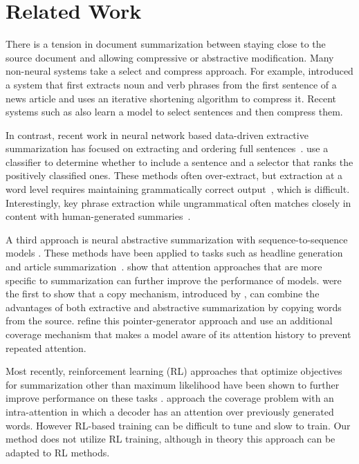 \documentclass[11pt,a4paper]{article}
\begin{document}
\section{Related Work}
 
There is a tension in document summarization between staying close
to the source document and allowing compressive or abstractive modification. Many non-neural systems take a select and compress approach. For example, \citet{dorr2003hedge} introduced a system that first extracts noun and verb phrases from the first sentence of a news article and uses an iterative shortening algorithm to compress it. Recent systems such as \citet{durrett2016learning} also learn a model to select sentences and then compress them. 

In contrast, recent work in neural network based data-driven extractive summarization has focused on  extracting and ordering full sentences~\citep{cheng2016neural,dlikman2016using}. \citet{nallapati2016classify} use a classifier to determine whether to include a sentence and a selector that ranks the positively classified ones. 
These methods often over-extract, but extraction at a word level requires maintaining grammatically correct output~\citep{cheng2016neural}, which is difficult. Interestingly, key phrase extraction while ungrammatical often matches closely in content with human-generated summaries~\citep{bui2016extractive}.
 
A third approach is neural abstractive summarization with
sequence-to-sequence models
\cite{sutskever2014sequence,bahdanau2014neural}. These methods have
been applied to tasks such as headline
generation~\citep{rush2015neural} and article
summarization~\citep{nallapati2016abstractive}. \citet{chopra2016abstractive}
show that attention approaches that are more specific to summarization
can further improve the performance of
models. \citet{gu2016incorporating} were the first to show that a copy
mechanism, introduced by \citet{vinyals2015pointer}, can combine the
advantages of both extractive and abstractive summarization by copying
words from the source. \citet{see2017get} refine this pointer-generator approach and use an
additional coverage mechanism \citep{tu2016modeling} that makes a
model aware of its attention history to prevent repeated attention.

Most recently, reinforcement learning (RL) approaches that optimize objectives for summarization other than maximum likelihood have been shown to further improve performance on these tasks \citep{paulus2017deep,li2018actor, celikyilmaz2018deep}. 
\citet{paulus2017deep} approach the coverage problem with an intra-attention in which a decoder has an attention over previously generated words. However RL-based training can be difficult to tune and slow to train.
Our method does not utilize RL training, although in theory this approach can be adapted to RL methods.
\end{document}
